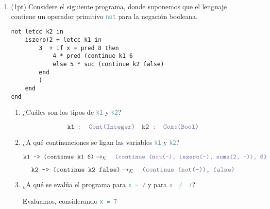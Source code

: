 \documentclass{article}
\newcommand{\tx}[1]{\textcolor{Black} {\texttt{#1}}}
\newcommand{\tp}[1]{\textcolor{CadetBlue} {\texttt{#1}}}
\newcommand{\pt}[1]{\textcolor{RoyalPurple}{(#1pt)}}
\newcommand{\kr}{\rightarrow_{\mathcal{K}} \quad}
\begin{document}
\begin{enumerate}
        \item \pt{1} Considere el siguiente programa, donde suponemos que el
        lenguaje contiene un operador primitivo \tp{not} para la negación
        booleana.

        \begin{verbatim}
not letcc k2 in
    iszero(2 + letcc k1 in
        3  + if x = pred 8 then
            4 * pred (continue k1 6
            else 5 * suc (continue k2 false)
        end
        )
    end
end
        \end{verbatim}
        \begin{enumerate}
            \item ¿Cuáles son los tipos de \tp{k1} y \tp{k2}?

            \[
                \tx{k1 : } \tp{Cont(Integer)} \quad \tx{k2 : } \tp{Cont(Bool)}
            \]

            \item ¿A qué continuaciones se ligan las variables \tp{k1} y \tp{k2}?

			\[
			\tx{k1 --> (continue k1 6)} 
			\kr \tp{(continue (not(-), iszero(-), suma(2, -)), 6)}
			\]
			
			\[
			\tx{k2 --> (continue k2 false)} 
			\kr \tp{(continue (not(-)), false)}
			\]
			
            \item ¿A qué se evalúa el programa para \tp{x = 7} y para \tp{x $\neq$ 7}?
     		
     		Evaluamos, considerando \tp{x = 7}


\end{enumerate}
\end{enumerate}
\end{document}
